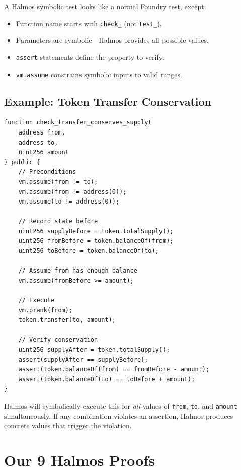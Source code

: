\documentclass[11pt,a4paper]{article}
\begin{document}
A Halmos symbolic test looks like a normal Foundry test, except:
\begin{itemize}[nosep]
  \item Function name starts with \texttt{check\_} (not \texttt{test\_}).
  \item Parameters are symbolic---Halmos provides all possible values.
  \item \texttt{assert} statements define the property to verify.
  \item \texttt{vm.assume} constrains symbolic inputs to valid ranges.
\end{itemize}

\subsection{Example: Token Transfer Conservation}

\begin{lstlisting}[language=Solidity,caption={Symbolic test: total supply is conserved by transfers}]
function check_transfer_conserves_supply(
    address from,
    address to,
    uint256 amount
) public {
    // Preconditions
    vm.assume(from != to);
    vm.assume(from != address(0));
    vm.assume(to != address(0));

    // Record state before
    uint256 supplyBefore = token.totalSupply();
    uint256 fromBefore = token.balanceOf(from);
    uint256 toBefore = token.balanceOf(to);

    // Assume from has enough balance
    vm.assume(fromBefore >= amount);

    // Execute
    vm.prank(from);
    token.transfer(to, amount);

    // Verify conservation
    uint256 supplyAfter = token.totalSupply();
    assert(supplyAfter == supplyBefore);
    assert(token.balanceOf(from) == fromBefore - amount);
    assert(token.balanceOf(to) == toBefore + amount);
}
\end{lstlisting}

Halmos will symbolically execute this for \emph{all} values of \texttt{from},
\texttt{to}, and \texttt{amount} simultaneously. If any combination violates an
assertion, Halmos produces concrete values that trigger the violation.

\section{Our 9 Halmos Proofs}
\end{document}
